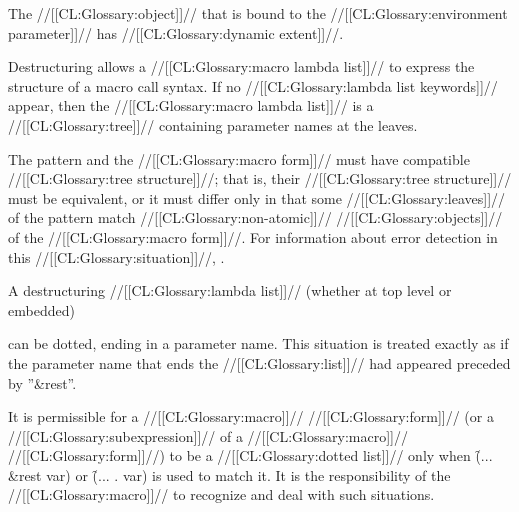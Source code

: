  The //[[CL:Glossary:object]]// that is bound to the //[[CL:Glossary:environment parameter]]// has //[[CL:Glossary:dynamic extent]]//.

 

Destructuring allows a //[[CL:Glossary:macro lambda list]]// to express the structure of a macro call syntax. If no //[[CL:Glossary:lambda list keywords]]// appear, then the //[[CL:Glossary:macro lambda list]]// is a //[[CL:Glossary:tree]]// containing parameter names at the leaves.

The pattern and the //[[CL:Glossary:macro form]]// must have compatible //[[CL:Glossary:tree structure]]//;  that is, their //[[CL:Glossary:tree structure]]// must be equivalent, or it must differ only in that some //[[CL:Glossary:leaves]]// of the pattern match //[[CL:Glossary:non-atomic]]// //[[CL:Glossary:objects]]// of the //[[CL:Glossary:macro form]]//.  For information about error detection in this //[[CL:Glossary:situation]]//, \seesection\DestructuringMismatch.


A destructuring //[[CL:Glossary:lambda list]]// (whether at top level or embedded) 

can be dotted, ending in a parameter name.  This situation is treated exactly as if the parameter name that ends the //[[CL:Glossary:list]]// had appeared preceded by ''&rest''.

 It is permissible for a //[[CL:Glossary:macro]]// //[[CL:Glossary:form]]// (or a //[[CL:Glossary:subexpression]]// of a //[[CL:Glossary:macro]]// //[[CL:Glossary:form]]//) to be a //[[CL:Glossary:dotted list]]//  only  when \f{(... \&rest var)} or \f{(... . var)} is used to match
 it. It is the responsibility of the //[[CL:Glossary:macro]]// to recognize and deal
 with such situations. %

 

